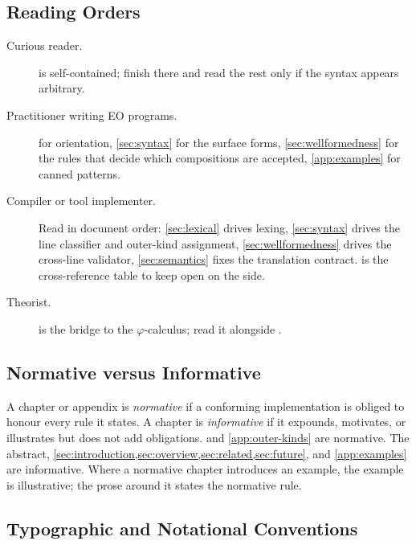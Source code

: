 \subsection{Reading Orders}\label{sec:preamble:orders}

\begin{description}
  \item[Curious reader.]
     is self-contained; finish there and read the
    rest only if the syntax appears arbitrary.
  \item[Practitioner writing EO programs.]
     for orientation, \cref{sec:syntax} for the
    surface forms, \cref{sec:wellformedness} for the rules that decide
    which compositions are accepted, \cref{app:examples} for canned
    patterns.
  \item[Compiler or tool implementer.]
    Read in document order: \cref{sec:lexical} drives lexing,
    \cref{sec:syntax} drives the line classifier and outer-kind
    assignment, \cref{sec:wellformedness} drives the cross-line
    validator, \cref{sec:semantics} fixes the translation contract.
     is the cross-reference table to keep open
    on the side.
  \item[Theorist.]
     is the bridge to the \(\varphi\)-calculus;
    read it alongside \citet{bugayenko2021eolang}.
\end{description}

\subsection{Normative versus Informative}\label{sec:preamble:status}

A chapter or appendix is \emph{normative} if a conforming implementation
  is obliged to honour every rule it states.
A chapter is \emph{informative} if it expounds, motivates, or
  illustrates but does not add obligations.
 and
  \cref{app:outer-kinds} are normative.
The abstract, \cref{sec:introduction,sec:overview,sec:related,sec:future},
  and \cref{app:examples} are informative.
Where a normative chapter introduces an example, the example is
  illustrative; the prose around it states the normative rule.

\subsection{Typographic and Notational Conventions}\label{sec:preamble:conventions}

